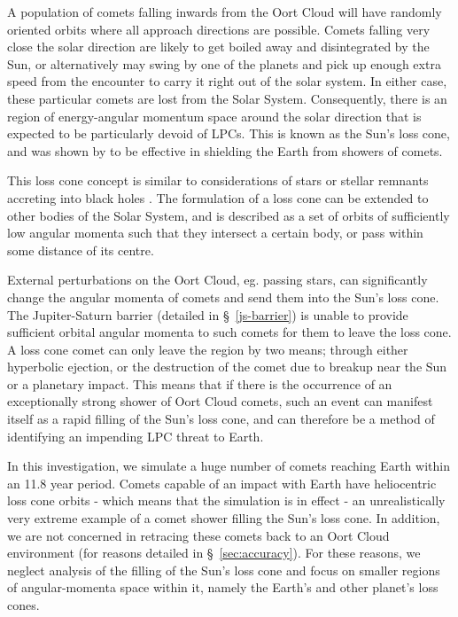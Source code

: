 A population of comets falling inwards from the Oort Cloud will have randomly oriented orbits where all approach directions are possible. Comets falling very close the solar direction are likely to get boiled away and disintegrated by the Sun, or alternatively may swing by one of the planets and pick up enough extra speed from the encounter to carry it right out of the solar system. In either case, these particular comets are lost from the Solar System. Consequently, there is an region of energy-angular momentum space around the solar direction that is expected to be particularly devoid of LPCs. This is known as the Sun's loss cone, and was shown by \cite{1981AJ.....86.1730H} to be effective in shielding the Earth from showers of comets.

This loss cone concept is similar to considerations of stars or stellar remnants accreting into black holes \citep{0264-9381-30-24-244005}. The formulation of a loss cone can be extended to other bodies of the Solar System, and is described as a set of orbits of sufficiently low angular momenta such that they intersect a certain body, or pass within some distance of its centre. %



External perturbations on the Oort Cloud, eg. passing stars, can significantly change the angular momenta of comets and send them into the Sun's loss cone. The Jupiter-Saturn barrier (detailed in \S~\ref{js-barrier}) is unable to provide sufficient orbital angular momenta to such comets for them to leave the loss cone. A loss cone comet can only leave the region by two means; through either hyperbolic ejection, or the destruction of the comet due to breakup near the Sun or a planetary impact. This means that if there is the occurrence of an exceptionally strong shower of Oort Cloud comets, such an event can manifest itself as a rapid filling of the Sun's loss cone, and can therefore be a method of identifying an impending LPC threat to Earth.

In this investigation, we simulate a huge number of comets reaching Earth within an 11.8 year period. Comets capable of an impact with Earth have heliocentric loss cone orbits - which means that the simulation is in effect - an unrealistically very extreme example of a comet shower filling the Sun's loss cone. In addition, we are not concerned in retracing these comets back to an Oort Cloud environment (for reasons detailed in \S~\ref{sec:accuracy}). For these reasons, we neglect analysis of the filling of the Sun's loss cone and focus on smaller regions of angular-momenta space within it, namely the Earth's and other planet's loss cones.

